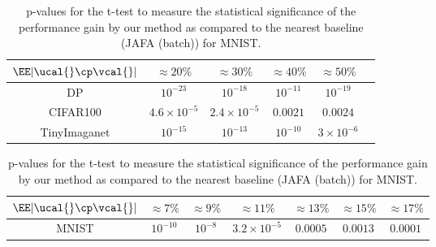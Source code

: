 \documentclass[letterpaper]{article}
\begin{document}
\begin{table}[!htb]
    \centering
\begin{tabular}{ |c|c|c|c|c|c| } 
\hline 
$\EE|\ucal{} \cp \vcal{}|$ & $\approx 20 \%$ & $\approx 30 \%$ & $\approx 40 \%$ & $\approx 50 \%$ \\
 \hline
 DP & $10^{-23}$ & $10^{-18}$ & $10^{-11}$ & $10^{-19}$ \\ 
 \hline
  CIFAR100 & $4.6\times 10^{-5}$ & $2.4\times 10^{-5}$ & $ 0.0021$ & $ 0.0024$ \\ 
 \hline
 TinyImaganet & $10^{-15}$ & $10^{-13}$ & $10^{-10}$ & $3\times10^{-6}$ \\ 
 \hline
\end{tabular}
\caption{p-values for the t-test to measure the statistical significance of the performance gain by our method as compared to the nearest baseline (JAFA (batch)) for DP, CIFAR100 and TinyImagenet.}
\label{table:p_values_dp}

\begin{tabular}{ |c|c|c|c|c|c|c| } 
\hline 
$\EE|\ucal{} \cp \vcal{}|$ & $\approx 7 \%$ & $\approx 9 \%$ & $\approx 11 \%$ & $\approx 13 \%$ & $\approx 15 \%$ & $\approx 17 \%$\\
 \hline
 MNIST & $10^{-10}$ & $10^{-8}$ & $3.2 \times 10^{-5}$ & $0.0005$ & $0.0013$ & $0.0001$ \\ 
 \hline
\end{tabular}
\caption{p-values for the t-test to measure the statistical significance of the performance gain by our method as compared to the nearest baseline (JAFA (batch)) for MNIST.}
\label{table:p_values_mnist}
\end{table}
\end{document}
